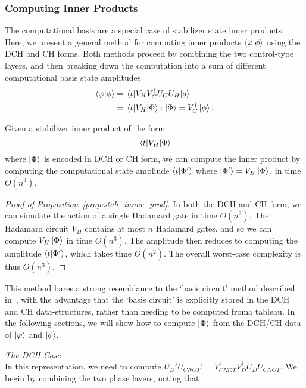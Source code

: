 \subsubsection*{Computing Inner Products}
The computational basis are a special case of stabilizer state inner products. Here, we present a general method for computing inner products $\braket{\varphi}{\phi}$ using the DCH and CH forms. Both methods proceed by combining the two control-type layers, and then breaking down the computation into a sum of different computational basis state amplitudes
\begin{align*}
\braket{\varphi}{\phi} &= \matrixel{t}{V_{H}V_{C}^{\dagger}U_{C}U_{H}}{s} \\
&= \matrixel{t}{V_{H}}{\Phi} : \ket{\Phi} = V_{C}^{\dagger} \ket{\phi}.
\end{align*}
\begin{prop}
Given a stabilizer inner product of the form
\[\matrixel{t}{V_{H}}{\Phi}\]
where $\ket{\Phi}$ is encoded in DCH or CH form, we can compute the inner product by computing the computational state ampliude $\braket{t}{\Phi'}$ where $\ket{\Phi'}=V_{H}\ket{\Phi}$, in time $O(n^{3})$.\label{prop:stab_inner_prod}
\end{prop}
\begin{proof}[Proof of Proposition~\ref{prop:stab_inner_prod}]
In both the DCH and CH form, we can simulate the action of a single Hadamard gate in time $O(n^{2})$. The Hadamard circuit $V_{H}$ contains at most $n$ Hadamard gates, and so we can compute $V_{H}\ket{\Phi}$ in time $O(n^{3})$. The amplitude then reduces to computing the amplitude $\braket{t}{\Phi'}$, which takes time $O(n^{2})$. The overall worst-case complexity is thus $O(n^{3})$.
\end{proof}
This method bares a strong resemblance to the `basis circuit' method described in~\cite{Garcia2012}, with the advantage that the `basis circuit' is explicitly stored in the DCH and CH data-structures, rather than needing to be computed froma  tableau. In the following sections, we will show how to compute $\ket{\Phi}$ from the DCH/CH data of $\ket{\varphi}$ and $\ket{\phi}$.\par
\large{\itshape{The DCH Case}}\\
In this representation, we need to compute $U_{D}'U_{CNOT}'=V_{CNOT}^{\dagger}V_{D}^{\dagger}U_{D}U_{CNOT}$. We begin by combining the two phase layers, noting that
